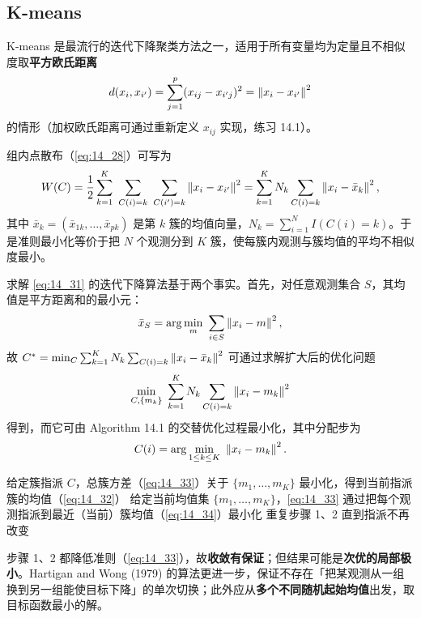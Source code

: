 \subsection{K-means}

K-means 是最流行的迭代下降聚类方法之一，适用于所有变量均为定量且不相似度取\textbf{平方欧氏距离}
\[
d(x_i,x_{i'}) = \sum_{j=1}^{p}(x_{ij}-x_{i'j})^2 = \left\lVert x_i-x_{i'}\right\rVert^2
\]
的情形（加权欧氏距离可通过重新定义 $x_{ij}$ 实现，练习 14.1）。

组内点散布（\eqref{eq:14_28}）可写为
\begin{equation}
W(C) = \frac12\sum_{k=1}^{K}\ \sum_{C(i)=k}\ \sum_{C(i')=k}\norm{x_i-x_{i'}}^2
= \sum_{k=1}^{K} N_k \sum_{C(i)=k}\norm{x_i-\bar x_k}^2, \label{eq:14_31}
\end{equation}
其中 $\bar x_k=(\bar x_{1k},\dots,\bar x_{pk})$ 是第 $k$ 簇的均值向量，$N_k=\sum_{i=1}^{N}I(C(i)=k)$。于是准则最小化等价于把 $N$ 个观测分到 $K$ 簇，使每簇内观测与簇均值的平均不相似度最小。

求解 \eqref{eq:14_31} 的迭代下降算法基于两个事实。首先，对任意观测集合 $S$，其均值是平方距离和的最小元：
\begin{equation}
\bar x_S = \arg\min_{m}\ \sum_{i\in S}\left\lVert x_i - m\right\rVert^2, \label{eq:14_32}
\end{equation}
故 $C^*=\min_C\sum_{k=1}^{K}N_k\sum_{C(i)=k}\left\lVert x_i-\bar x_k\right\rVert^2$ 可通过求解扩大后的优化问题
\begin{equation}
\min_{C,\{m_k\}}\ \sum_{k=1}^{K} N_k\sum_{C(i)=k}\left\lVert x_i - m_k\right\rVert^2 \label{eq:14_33}
\end{equation}
得到，而它可由 Algorithm 14.1 的交替优化过程最小化，其中分配步为
\begin{equation}
C(i) = \arg\min_{1\le k\le K}\ \left\lVert x_i - m_k\right\rVert^2. \label{eq:14_34}
\end{equation}

\begin{algorithm}[H]
\caption{K-means 聚类（Algorithm 14.1）}
\begin{algorithmic}[1]
\State 给定簇指派 $C$，总簇方差（\eqref{eq:14_33}）关于 $\{m_1,\dots,m_K\}$ 最小化，得到当前指派簇的均值（\eqref{eq:14_32}）
\State 给定当前均值集 $\{m_1,\dots,m_K\}$，\eqref{eq:14_33} 通过把每个观测指派到最近（当前）簇均值（\eqref{eq:14_34}）最小化
\State 重复步骤 1、2 直到指派不再改变
\end{algorithmic}
\end{algorithm}

步骤 1、2 都降低准则（\eqref{eq:14_33}），故\textbf{收敛有保证}；但结果可能是\textbf{次优的局部极小}。Hartigan and Wong (1979) 的算法更进一步，保证不存在「把某观测从一组换到另一组能使目标下降」的单次切换；此外应从\textbf{多个不同随机起始均值}出发，取目标函数最小的解。

